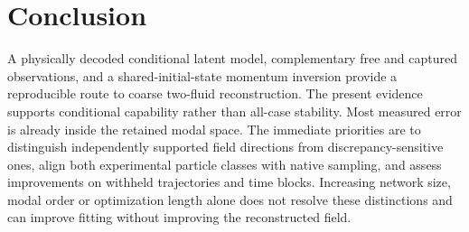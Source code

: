 \documentclass[11pt]{article}
\numberwithin{equation}{section}
\begin{document}
\section{Conclusion}

A physically decoded conditional latent model, complementary free and captured observations, and a shared-initial-state momentum inversion provide a reproducible route to coarse two-fluid reconstruction. The present evidence supports conditional capability rather than all-case stability. Most measured error is already inside the retained modal space. The immediate priorities are to distinguish independently supported field directions from discrepancy-sensitive ones, align both experimental particle classes with native sampling, and assess improvements on withheld trajectories and time blocks. Increasing network size, modal order or optimization length alone does not resolve these distinctions and can improve fitting without improving the reconstructed field.
\end{document}
